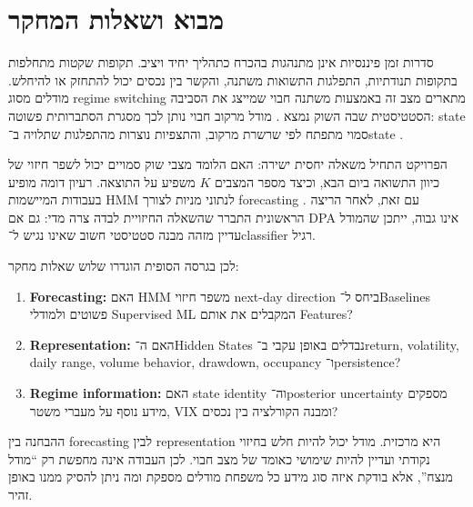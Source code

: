 \section{מבוא ושאלות המחקר}

סדרות זמן פיננסיות אינן מתנהגות בהכרח כתהליך יחיד ויציב. תקופות שקטות מתחלפות בתקופות תנודתיות, התפלגות התשואות משתנה, והקשר בין נכסים יכול להתחזק או להיחלש. מודלים מסוג regime switching מתארים מצב זה באמצעות משתנה חבוי שמייצג את הסביבה הסטטיסטית שבה השוק נמצא \cite{hamilton1989new}. מודל מרקוב חבוי נותן לכך מסגרת הסתברותית פשוטה: state סמוי מתפתח לפי שרשרת מרקוב, והתצפיות נוצרות מהתפלגות שתלויה ב־state \cite{rabiner1989tutorial,murphy2012machine}.

הפרויקט התחיל משאלה יחסית ישירה: האם  הלומד מצבי שוק סמויים יכול לשפר חיזוי של כיוון התשואה ביום הבא, וכיצד מספר המצבים \(K\) משפיע על התוצאה. רעיון דומה מופיע בעבודות המיישמות HMM לנתוני מניות לצורך forecasting \cite{catello2023hmm}. עם זאת, לאחר הריצה הראשונית התברר שהשאלה החיזויית לבדה צרה מדי: גם אם DPA אינו גבוה, ייתכן שהמודל עדיין מזהה מבנה סטטיסטי חשוב שאינו נגיש ל־classifier רגיל.

לכן בגרסה הסופית הוגדרו שלוש שאלות מחקר:

\begin{enumerate}
    \item \textbf{Forecasting:} האם HMM משפר חיזוי next-day direction ביחס ל־Baselines פשוטים ולמודלי Supervised ML המקבלים את אותם Features?
    \item \textbf{Representation:} האם ה־Hidden States נבדלים באופן עקבי ב־return, volatility, daily range, volume behavior, drawdown, occupancy ו־persistence?
    \item \textbf{Regime information:} האם state identity וה־posterior uncertainty מספקים מידע נוסף על מעברי משטר, VIX ומבנה הקורלציה בין נכסים?
\end{enumerate}

ההבחנה בין forecasting לבין representation היא מרכזית. מודל יכול להיות חלש בחיזוי נקודתי ועדיין להיות שימושי כאומד של מצב חבוי. לכן העבודה אינה מחפשת רק ``מודל מנצח'', אלא בודקת איזה סוג מידע כל משפחת מודלים מספקת ומה ניתן להסיק ממנו באופן זהיר.
